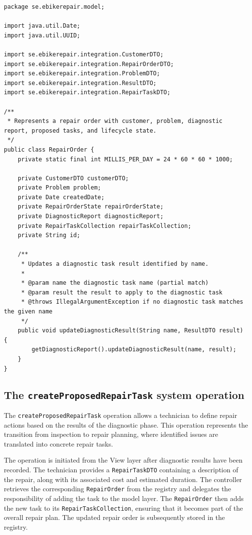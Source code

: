 \documentclass[a4paper]{scrartcl}
\begin{document}
\begin{lstlisting}[style=javastyle, caption={Main class entry point}]
package se.ebikerepair.model;

import java.util.Date;
import java.util.UUID;

import se.ebikerepair.integration.CustomerDTO;
import se.ebikerepair.integration.RepairOrderDTO;
import se.ebikerepair.integration.ProblemDTO;
import se.ebikerepair.integration.ResultDTO;
import se.ebikerepair.integration.RepairTaskDTO;

/**
 * Represents a repair order with customer, problem, diagnostic report, proposed tasks, and lifecycle state.
 */
public class RepairOrder {
    private static final int MILLIS_PER_DAY = 24 * 60 * 60 * 1000;

    private CustomerDTO customerDTO;
    private Problem problem;
    private Date createdDate;
    private RepairOrderState repairOrderState;
    private DiagnosticReport diagnosticReport;
    private RepairTaskCollection repairTaskCollection;
    private String id;

    /**
     * Updates a diagnostic task result identified by name.
     *
     * @param name the diagnostic task name (partial match)
     * @param result the result to apply to the diagnostic task
     * @throws IllegalArgumentException if no diagnostic task matches the given name
     */
    public void updateDiagnosticResult(String name, ResultDTO result) {
        getDiagnosticReport().updateDiagnosticResult(name, result);
    }
}

\end{lstlisting}

\subsection{The \texttt{createProposedRepairTask} system operation}

The \texttt{createProposedRepairTask} operation allows a technician to define repair actions based on the results of the diagnostic phase. This operation represents the transition from inspection to repair planning, where identified issues are translated into concrete repair tasks.

The operation is initiated from the View layer after diagnostic results have been recorded. The technician provides a \texttt{RepairTaskDTO} containing a description of the repair, along with its associated cost and estimated duration. The controller retrieves the corresponding \texttt{RepairOrder} from the registry and delegates the responsibility of adding the task to the model layer. The \texttt{RepairOrder} then adds the new task to its \texttt{RepairTaskCollection}, ensuring that it becomes part of the overall repair plan. The updated repair order is subsequently stored in the registry.
\end{document}
